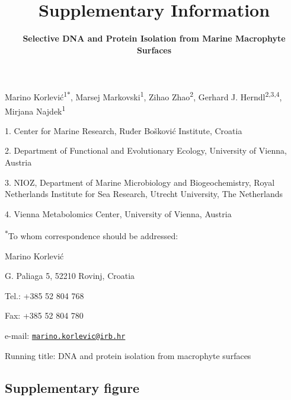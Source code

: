 \documentclass[12pt,]{article}
\title{\textbf{Supplementary Information}}
\subtitle{\textbf{Selective DNA and Protein Isolation from Marine Macrophyte
Surfaces}}
\author{}
\date{}
\begin{document}
\maketitle

\vspace{20mm}

Marino Korlević\textsuperscript{1\(*\)}, Marsej
Markovski\textsuperscript{1}, Zihao Zhao\textsuperscript{2}, Gerhard J.
Herndl\textsuperscript{2,3,4}, Mirjana Najdek\textsuperscript{1}

1. Center for Marine Research, Ruđer Bošković Institute, Croatia

2. Department of Functional and Evolutionary Ecology, University of
Vienna, Austria

3. NIOZ, Department of Marine Microbiology and Biogeochemistry, Royal
Netherlands Institute for Sea Research, Utrecht University, The
Netherlands

4. Vienna Metabolomics Center, University of Vienna, Austria

\textsuperscript{\(*\)}To whom correspondence should be addressed:

Marino Korlević

G. Paliaga 5, 52210 Rovinj, Croatia

Tel.: +385 52 804 768

Fax: +385 52 804 780

e-mail:
\href{mailto:marino.korlevic@irb.hr}{\nolinkurl{marino.korlevic@irb.hr}}

Running title: DNA and protein isolation from macrophyte surfaces

\setlength\parindent{24pt}

\hypertarget{supplementary-figure}{%
\subsection{Supplementary figure}\label{supplementary-figure}}
\end{document}
